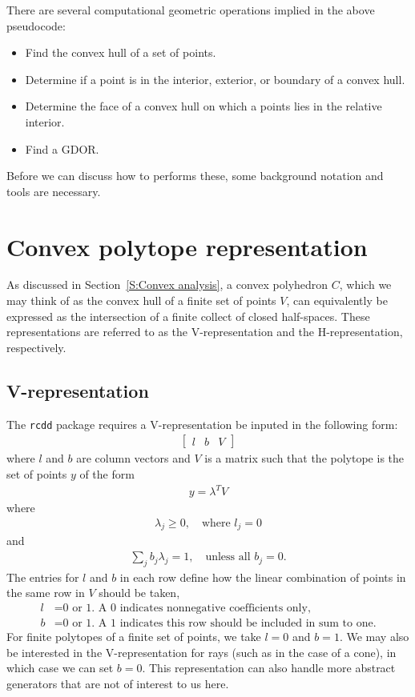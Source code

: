There are several computational geometric operations implied in the above pseudocode:
\begin{itemize}
\item Find the convex hull of a set of points.
\item Determine if a point is in the interior, exterior, or  boundary of a convex hull.
\item Determine the face of a convex hull on which a points lies in the relative interior.
\item Find a GDOR.
\end{itemize}

Before we can discuss how to performs these, some background notation
and tools are necessary.

\section{Convex polytope representation}
As discussed in Section~\ref{S:Convex analysis}, a convex polyhedron $C$, which we 
may think of as the convex hull of a finite set of points $V$, can equivalently
be expressed as the intersection of a finite collect of closed half-spaces.  These
representations are referred to as the V-representation and the H-representation, 
respectively.

\subsection{V-representation} \label{S:V-rep}
The \texttt{rcdd} package requires a V-representation be inputed in the following form:
\begin{align} \label{E:V-rep}
	\left[\begin{array}{ccc}l & b & V\end{array}\right]
\end{align}
where $l$ and $b$ are column vectors and $V$ is a matrix such that the polytope
is the set of points $y$ of the form
\begin{align*}
	y = \lambda^T V
\end{align*}
where
\begin{align*}
	\lambda_j \geq 0, \quad \text{where $l_j = 0$}
\end{align*}
and 
\begin{align*}
	\sum_j b_j \lambda_j = 1, \quad \text{unless all $b_j = 0$.}
\end{align*}
The entries for $l$ and $b$ in each row define how the linear combination of 
points in the same row in $V$ should be taken,
\begin{align*}
	l &= \text{0 or 1.  A 0 indicates nonnegative coefficients only,}\\
	b &= \text{0 or 1.  A 1 indicates this row should be included in sum to one.}
\end{align*}
For finite polytopes of a finite set of points, we take $l = 0$ and $b = 1$.  
We may also be interested in the V-representation for rays (such as in the
case of a cone), in which case we can set $b=0$.  
This representation can also handle more abstract generators that 
are not of interest to us here.

